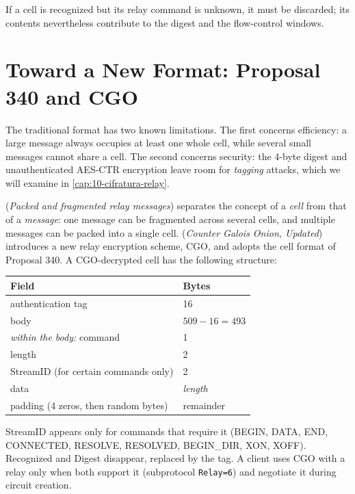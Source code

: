 If a cell is recognized but its relay command is unknown, it must be discarded; its contents nevertheless contribute to the digest and the flow-control windows.

\section{Toward a New Format: Proposal 340 and CGO}\label{sec:nuovo-formato}

The traditional format has two known limitations. The first concerns efficiency: a large message always occupies at least one whole cell, while several small messages cannot share a cell. The second concerns security: the 4-byte digest and unauthenticated AES-CTR encryption leave room for \emph{tagging} attacks, which we will examine in \cref{cap:10-cifratura-relay}.

 (\emph{Packed and fragmented relay messages}) separates the concept of a \emph{cell} from that of a \emph{message}: one message can be fragmented across several cells, and multiple messages can be packed into a single cell.  (\emph{Counter Galois Onion, Updated}) introduces a new relay encryption scheme, CGO, and adopts the cell format of Proposal 340. A CGO-decrypted cell has the following structure:

\begin{center}
\begin{tabular}{ll}
\toprule
Field & Bytes \\
\midrule
authentication tag & 16 \\
body & $509 - 16 = 493$ \\
\midrule
\quad \emph{within the body:} command & 1 \\
\quad length & 2 \\
\quad StreamID (for certain commands only) & 2 \\
\quad data & \emph{length} \\
\quad padding (4 zeros, then random bytes) & remainder \\
\bottomrule
\end{tabular}
\end{center}

StreamID appears only for commands that require it (BEGIN, DATA, END, CONNECTED, RESOLVE, RESOLVED, BEGIN\_DIR, XON, XOFF). Recognized and Digest disappear, replaced by the tag. A client uses CGO with a relay only when both support it (subprotocol \texttt{Relay=6}) and negotiate it during circuit creation.

